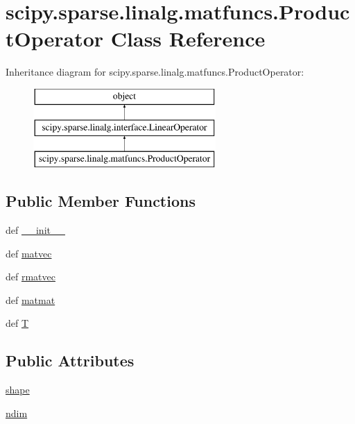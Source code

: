 \hypertarget{classscipy_1_1sparse_1_1linalg_1_1matfuncs_1_1ProductOperator}{}\section{scipy.\+sparse.\+linalg.\+matfuncs.\+Product\+Operator Class Reference}
\label{classscipy_1_1sparse_1_1linalg_1_1matfuncs_1_1ProductOperator}
Inheritance diagram for scipy.\+sparse.\+linalg.\+matfuncs.\+Product\+Operator\+:\begin{figure}[H]
\begin{center}
\leavevmode
\includegraphics[height=3.000000cm]{classscipy_1_1sparse_1_1linalg_1_1matfuncs_1_1ProductOperator}
\end{center}
\end{figure}
\subsection*{Public Member Functions}
\begin{DoxyCompactItemize}
\item 
def \hyperlink{classscipy_1_1sparse_1_1linalg_1_1matfuncs_1_1ProductOperator_ab4f728500e12b8acc9f209b21fdfa2c4}{\+\_\+\+\_\+init\+\_\+\+\_\+}
\item 
def \hyperlink{classscipy_1_1sparse_1_1linalg_1_1matfuncs_1_1ProductOperator_a7b0be778f54f641f4129e58a9a0f283e}{matvec}
\item 
def \hyperlink{classscipy_1_1sparse_1_1linalg_1_1matfuncs_1_1ProductOperator_ac17af1b06fc4cdade520ee10f2db7579}{rmatvec}
\item 
def \hyperlink{classscipy_1_1sparse_1_1linalg_1_1matfuncs_1_1ProductOperator_a7eb4223a87c121bad81aab35c05ceb48}{matmat}
\item 
def \hyperlink{classscipy_1_1sparse_1_1linalg_1_1matfuncs_1_1ProductOperator_a1878c67ac22d044a5ecb9d75b8c99eb4}{T}
\end{DoxyCompactItemize}
\subsection*{Public Attributes}
\begin{DoxyCompactItemize}
\item 
\hyperlink{classscipy_1_1sparse_1_1linalg_1_1matfuncs_1_1ProductOperator_a5bea152225176013d5a24b0261739ae8}{shape}
\item 
\hyperlink{classscipy_1_1sparse_1_1linalg_1_1matfuncs_1_1ProductOperator_a5ad92b9a108f6cad2d5ad85488986e33}{ndim}
\end{DoxyCompactItemize}


